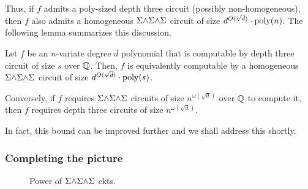 Thus, if $f$ admits a poly-sized depth three circuit (possibly non-homogeneous), then $f$ also
admits a homogeneous $\Sigma\mathord{\wedge}\Sigma\mathord{\wedge}\Sigma$ circuit of
size $d^{O(\sqrt{d})} \cdot \mathrm{poly}(n)$.
The following lemma summarizes this discussion. 

\begin{lemma}\label{lem:pow-depth3}
  Let $f$ be an $n$-variate degree $d$ polynomial that is computable
  by depth three circuit of size $s$ over $\mathbb{Q}$.
  Then, $f$ is equivalently computable by a homogeneous
  $\Sigma\mathord{\wedge}\Sigma\mathord{\wedge}\Sigma$ circuit of size
  $d^{O(\sqrt{d})}\cdot \mathrm{poly}(s)$. 

  Conversely, if $f$ requires $\Sigma\mathord{\wedge}\Sigma\mathord{\wedge}\Sigma$
  circuits of size $n^{\omega(\sqrt{d})}$ over $\mathbb{Q}$ to compute it,
  then $f$ requires depth three circuits of size
  $n^{\omega(\sqrt{d})}$. 
\end{lemma}

In fact, this bound can be improved further and we shall address this
shortly. 

\subsubsection{Completing the picture}

\begin{figure}
\begin{center}
\end{center}
\caption{Power of $\Sigma\mathord{\wedge}\Sigma\mathord{\wedge}\Sigma$ ckts.}
\label{fig:SESES}
\end{figure}


